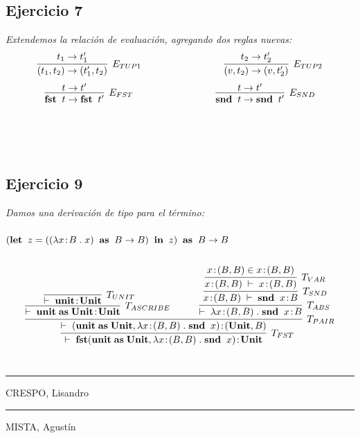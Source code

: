 \documentclass[a4paper,10pt]{article}
\begin{document}
\subsection*{Ejercicio 7} 
	\emph{Extendemos la relación de evaluación, agregando dos reglas nuevas:}
	\\
	\begin{align*}
		\infer[E_{TUP1}]{
			(t_{1},t_{2}) \rightarrow (t_{1}',t_{2})
		}{
			t_{1} \rightarrow t_{1}'
		} \hspace{3cm}
		\infer[E_{TUP2}]{
			(v,t_{2}) \rightarrow (v,t_{2}')
		}{
			t_{2} \rightarrow t_{2}'
		}
	\end{align*}
	\begin{align*}
		\infer[E_{FST}]{
			{\bf fst}\;\;t \rightarrow {\bf fst}\;\;t'
		}{
			t \rightarrow t'
		} \hspace{3cm}
		\infer[E_{SND}]{
			{\bf snd}\;\;t \rightarrow {\bf snd}\;\;t'
		}{
			t \rightarrow t'
		}
	\end{align*}
	\\
	\\
	\\	
\subsection*{Ejercicio 9} 
	\emph{Damos una derivación de tipo para el término:
		\\
		\\ 
		\indent $({\bf let}\;\;z=((\lambda x\!:\!B\;.\;x)\;\;{\bf as}\;\;B \rightarrow B)\;\;{\bf in}\;\;z)\;\;{\bf as}\;\;B \rightarrow B$
	}
	\\
	\\
	\begin{align*}
		\infer[T_{FST}]{
			\vdash \; {\bf fst}({\bf unit} \;{\bf as}\; {\bf Unit},\lambda x\!:\!(B,B)\;.\;{\bf snd}\;\;x)\!:\!{\bf Unit}
		}{
			\infer[T_{PAIR}]
			{
				\vdash \; ({\bf unit} \;{\bf as}\; {\bf Unit},\lambda x\!:\!(B,B)\;.\;{\bf snd}\;\;x)\!:\!({\bf Unit}, B)
			}
			{
				\infer[T_{ASCRIBE}]
				{
					\vdash \; {\bf unit}\;{\bf as}\;{\bf Unit}\!:\!{\bf Unit}
				}
				{
					\infer[T_{UNIT}]
					{
						\vdash \; {\bf unit}\!:\!{\bf Unit}
					}
					{}
				} & \qquad
				\infer[T_{ABS}]
				{
					\vdash \; \lambda x\!:\!(B,B) \;.\;{\bf snd}\;\;x\!:\!B
				}
				{
					\infer[T_{SND}]
					{
						x\!:\!(B,B) \; \vdash \; {\bf snd} \;\; x\!:\!B
					}
					{
						\infer[T_{VAR}]
						{
							x\!:\!(B,B) \; \vdash \; x\!:\!(B,B)
						}{
							x\!:\!(B,B) \in x\!:\!(B,B)
						}
					}
				}
			}
		}
	\end{align*}
\pagebreak  %
\\
\vspace{\fill}
\begin{multicols}{2}
	\hrule
	\vspace{5pt}
	CRESPO, Lisandro \\
	\linebreak
	\hrule
	\vspace{5pt}
	MISTA, Agustín \\
\end{multicols}
\end{document}

